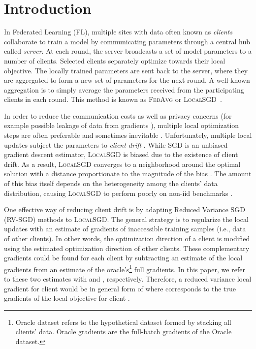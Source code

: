 \documentclass[runningheads]{llncs}
\newcommand{\fedavg}{\textsc{FedAvg}\xspace}
\newcommand{\localsgd}{\textsc{LocalSGD}\xspace}
\newcommand{\sgd}{\textsc{SGD}\xspace}
\newcommand{\rvsgd}{\textsc{RV-SGD}\xspace}
\begin{document}
\section{Introduction}
In Federated Learning (FL), multiple sites with data often known as \emph{clients} collaborate to train a model by communicating parameters through a central hub called \emph{server}. 
At each round, the server broadcasts a set of model parameters to a number of clients.
Selected clients separately optimize towards their local objective.
The locally trained parameters are sent back to the server, where they are aggregated to form a new set of parameters for the next round.
A well-known aggregation is to simply average the parameters received from the participating clients in each round.
This method is known as 
\fedavg \cite{mcmahan2017communication} or \localsgd~\cite{stich2018local}.


In order to reduce the communication costs as well as privacy concerns (for example possible leakage of data from gradients \cite{zhu2020deep}), multiple local optimization steps are often preferable and sometimes inevitable \cite{mcmahan2017communication}.
Unfortunately, multiple local updates subject the parameters to \emph{client drift} \cite{karimireddy2020scaffold}. While \sgd is an unbiased gradient descent estimator,
\localsgd is biased due to the existence of client drift.
As a result, \localsgd converges to a neighborhood around the optimal solution with a distance proportionate to the magnitude of the bias \cite{ajalloeian2020convergence}. 
The amount of this bias itself depends on the heterogeneity among the clients' data distribution, causing \localsgd to perform poorly on non-iid benchmarks \cite{zhao2018federated}.



One effective way of reducing client drift is by adapting Reduced Variance SGD (\rvsgd) methods \cite{johnson2013accelerating,roux2012stochastic,shalev2013stochastic,nguyen2017sarah} to \localsgd.
The general strategy is to regularize the local updates with an estimate of gradients of inaccessible training samples (i.e., data of other clients).
In other words, the optimization direction of a client is modified using the estimated optimization direction of other clients.
These complementary gradients could be found for each client  by subtracting an estimate of the local gradients from an estimate of the oracle's\footnote{Oracle dataset refers to the hypothetical dataset formed by stacking all clients' data.
Oracle gradients are the full-batch gradients of the Oracle dataset.} full gradients.
In this paper, we refer to these two estimates with  and , respectively.
Therefore, a reduced variance local gradient for client  would be in general form of  where  corresponds to the true gradients of the local objective for client . 
\end{document}
